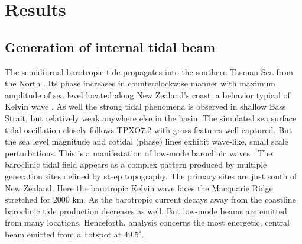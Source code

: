 \documentclass[12pt]{article}
\begin{document}
\section{Results}
\subsection{Generation of internal tidal beam}
The semidiurnal barotropic tide propagates into the southern Tasman Sea from the North 
. Its phase increases in counterclockwise manner with maximum amplitude of sea 
level located along 
New Zealand's coast, a behavior typical of Kelvin wave \citep{walters2001ocean}. As well the 
strong tidal phenomena is observed in shallow Bass Strait, but relatively weak anywhere else in the 
basin. 
The simulated sea surface tidal oscillation closely follows TPXO7.2 with gross 
features well captured. But the sea level magnitude and cotidal (phase) lines exhibit wave-like, 
small scale perturbations. This is a manifestation of low-mode baroclinic waves 
. The baroclinic tidal field appears as a complex pattern produced by multiple 
generation sites defined by steep topography. The primary sites are just south of 
New Zealand. Here the barotropic Kelvin wave faces the Macquarie Ridge stretched for 2000 km. As 
the barotropic current decays away from the coastline baroclinic tide production decreases as well. 
But low-mode beams are emitted from many locations. Henceforth, analysis concerns the 
most energetic, central beam emitted from a hotspot at $49.5^{\circ}$.\\
\end{document}
